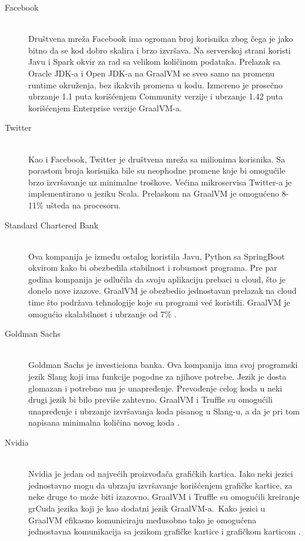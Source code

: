 \documentclass[a4paper]{article}
\begin{document}
\begin{description}
	\item[Facebook] \hfill \\
	Društvena mreža Facebook ima ogroman broj korisnika zbog čega je jako bitno da se kod dobro skalira i brzo izvršava.
	Na serverskoj strani koristi Javu i Spark okvir za rad sa velikom količinom podataka. Prelazak sa Oracle JDK-a i Open JDK-a na GraalVM se sveo samo na promenu runtime okruženja, bez ikakvih promena u kodu. Izmereno je prosečno ubrzanje 1.1 puta korišćenjem Community verzije i ubrzanje 1.42 puta korišćenjem Enterprise verzije GraalVM-a. \cite{graalvmusecases}
	
	\item[Twitter] \hfill \\
	Kao i Facebook, Twitter je društvena mreža sa milionima korisnika. Sa porastom broja korisnika bile su neophodne promene koje bi omogućile brzo izvršavanje uz minimalne troškove. Većina mikroservisa Twitter-a je implementirano u jeziku Scala. Prelaskom na GraalVM je omogućeno 8-11\% ušteda na procesoru. \cite{graalvmusecases}	
	
	\item[Standard Chartered Bank] \hfill \\
	Ova kompanija je između ostalog koristila Javu, Python sa SpringBoot okvirom kako bi obezbedila stabilnost i robusnost programa. Pre par godina kompanija je odlučila da svoju aplikaciju prebaci u cloud, što je donelo nove izazove. GraalVM je obezbedio jednostavan prelazak na cloud time što podržava tehnologije koje su programi već koristili. GraalVM je omogućio skalabilnost i ubrzanje od 7\% \cite{graalvmusecases}.
		
	\item[Goldman Sachs]  \hfill \\
        Goldman Sachs je investiciona banka. Ova kompanija ima svoj programski jezik Slang koji ima funkcije pogodne za njihove potrebe. Jezik je dosta glomazan i potrebno mu je unapređenje. Prevođenje celog koda u neki drugi jezik bi bilo previše zahtevno. GraalVM i Truffle su omogućili unapređenje i ubrzanje izvršavanja koda pisanog u Slang-u, a da je pri tom napisana minimalna količina novog koda \cite{graalvmusecases}.
	
	\item[Nvidia]  \hfill \\
	Nvidia je jedan od najvećih proizvođača grafičkih kartica. Iako neki jezici jednostavno mogu da ubrzaju izvršavanje korišćenjem grafičke kartice, za neke druge to može biti izazovno. GraalVM i Truffle su omogućili kreiranje grCuda jezika koji je kao dodatni jezik GraalVM-a.\ Kako jezici u GraalVM efikasno komuniciraju međusobno tako je omogućena jednostavna komunikacija sa jezikom grafičke kartice i grafičkom karticom \cite{graalvmusecases}.
	

\end{description}
\end{document}
